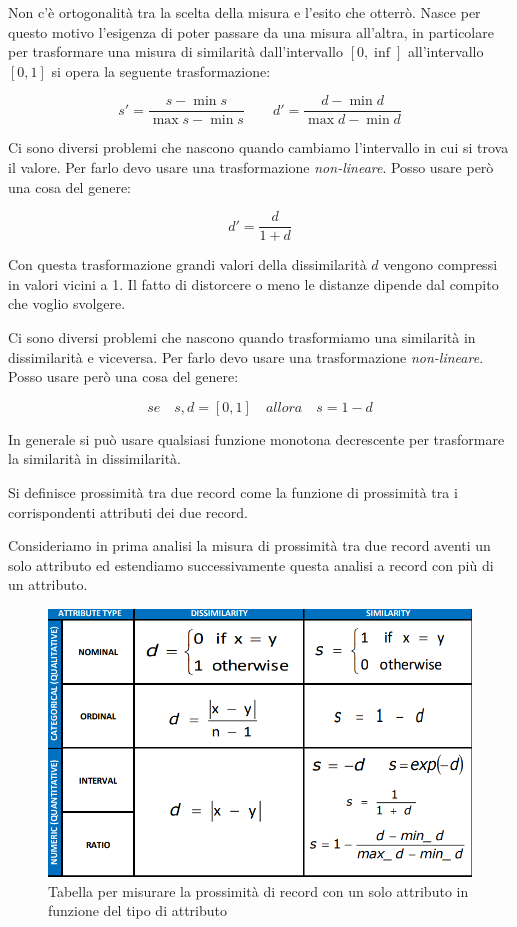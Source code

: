 Non c'è ortogonalità tra la scelta della misura e l'esito che otterrò. Nasce per questo motivo l'esigenza di poter passare da una misura all'altra, in particolare per trasformare una misura di similarità dall'intervallo $[0,\inf]$ all'intervallo $[0,1]$ si opera la seguente trasformazione:

\[s' = \frac{s - \min{s}}{\max{s} - \min{s}} \qquad d' = \frac{d - \min{d}}{\max{d} - \min{d}} \] 

Ci sono diversi problemi che nascono quando cambiamo l'intervallo in cui si trova il valore. Per farlo devo usare una trasformazione \textit{non-lineare}. Posso usare però una cosa del genere:

\[ d' = \frac{d}{1+d}\]

Con questa trasformazione grandi valori della dissimilarità $d$ vengono compressi in valori vicini a 1. Il fatto di distorcere o meno le distanze dipende dal compito che voglio svolgere.

Ci sono diversi problemi che nascono quando trasformiamo una similarità in dissimilarità e viceversa. Per farlo devo usare una trasformazione \textit{non-lineare}. Posso usare però una cosa del genere:

\[ se \quad s,d = [0, 1]  \quad allora  \quad s =  1-d\]

In generale si può usare qualsiasi funzione monotona decrescente per trasformare la similarità in dissimilarità.

\begin{defn}
	Si definisce prossimità tra due record come la funzione di prossimità tra i corrispondenti attributi dei due record.	
\end{defn}

Consideriamo in prima analisi la misura di prossimità tra due record aventi un solo attributo ed estendiamo successivamente questa analisi a record con più di un attributo.
\begin{figure}[H]
	\centering
	\includegraphics[height=0.3 \linewidth]{clustering/pict/proximity_one.png}
	\caption{Tabella per misurare la prossimità di record con un solo attributo in funzione del tipo di attributo}
\end{figure}

